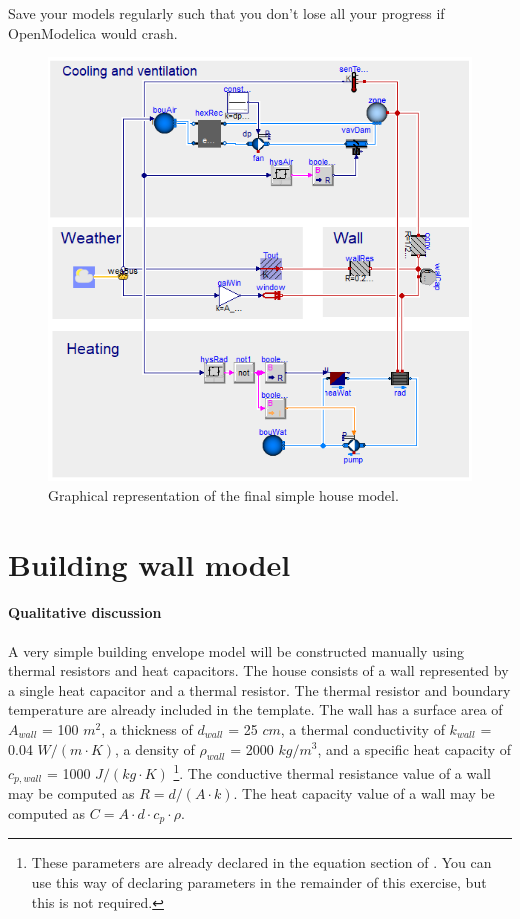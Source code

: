 \documentclass[10pt,a4paper]{article}
\begin{document}
Save your models regularly such that you don't lose all your progress if OpenModelica would crash.

\begin{figure}
\centering
\includegraphics[width=0.8\columnwidth]{simpleHouse.png}
\caption{Graphical representation of the final simple house model.}
\label{fig:simpleHouse}
\end{figure}


\newpage
\section{Building wall model}
\paragraph{Qualitative discussion}
A very simple building envelope model will be constructed manually using thermal resistors and heat capacitors. The house consists of a wall represented by a single heat capacitor and a thermal resistor. The thermal resistor and boundary temperature are already included in the template. The wall has a surface area of $A_{wall}$ = 100 $m^2$, a thickness of $d_{wall}$ = 25 $cm$, a thermal conductivity of $k_{wall}$ = 0.04 $W/(m \cdot K)$, a density of $\rho_{wall}$ = 2000 $kg/m^3$, and a specific heat capacity of $c_{p,wall}$ = 1000 $J/(kg \cdot K)$ \footnote{These parameters are already declared in the equation section of . You can use this way of declaring parameters in the remainder of this exercise, but this is not required.}. The conductive thermal resistance value of a wall may be computed as $R=d/(A\cdot k)$.
The heat capacity value of a wall may be computed as $C=A\cdot d \cdot c_p \cdot \rho$.
\end{document}
